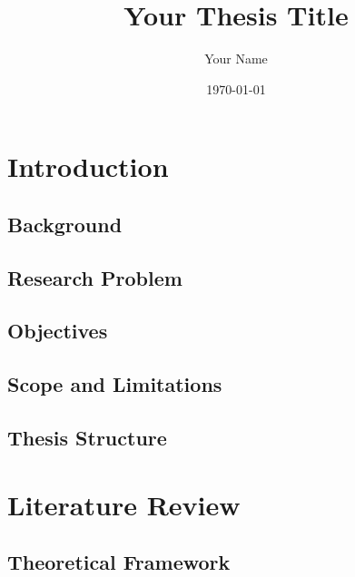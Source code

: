 \documentclass[12pt,a4paper]{report}
\title{Your Thesis Title}
\author{Your Name}
\date{\today}
\begin{document}
\maketitle

\begin{abstract}
\noindent
\lipsum[1-2] %
\end{abstract}

\newpage

\tableofcontents
\newpage

\chapter{Introduction}
\label{chap:introduction}

\section{Background}
\label{sec:background}
\lipsum[3-5]

\section{Research Problem}
\label{sec:problem}
\lipsum[6-8]

\section{Objectives}
\label{sec:objectives}
\lipsum[9-10]

\section{Scope and Limitations}
\label{sec:scope}
\lipsum[11-12]

\section{Thesis Structure}
\label{sec:structure}
\lipsum[13-14]

\chapter{Literature Review}
\label{chap:literature}

\section{Theoretical Framework}
\label{sec:theory}
\lipsum[15-17]
\end{document}
